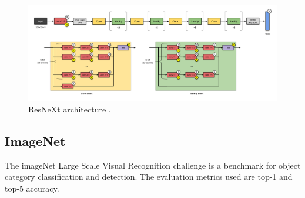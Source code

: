 \begin{figure}[H]
    \centering
    \captionsetup{justification=centering}
    \includegraphics[width=\textwidth]{Sections/2StateOfTheArt/2_images/resnext.png}
    \caption[ResNeXt architecture.]{ResNeXt architecture \cite{cnnarchitectures}. }
    \label{fig:noisestudent}
\end{figure}


\newpage

\subsection{ImageNet}
\par The imageNet Large Scale Visual Recognition challenge \cite{Russakovsky2015} is a benchmark for object category classification and detection. The evaluation metrics used are top-1 and top-5 accuracy.

